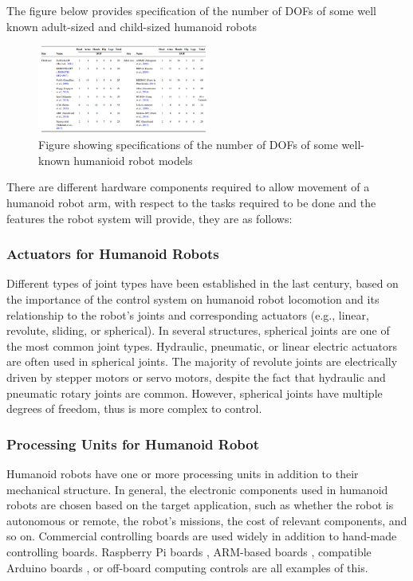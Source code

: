 \documentclass[conference]{IEEEtran}
\begin{document}
The figure below provides specification of the number of DOFs of some well known adult-sized and child-sized  humanoid robots

\begin{figure}[h]
    \centerline{\includegraphics[width=0.5\textwidth]{prerak_images/Picture7.png}}
    \caption{Figure showing specifications of the number of DOFs of some well-known humanioid robot models}
\label{prerakfig5}
\end{figure}

There are different hardware components required to allow movement of a humanoid robot arm, with respect to the tasks required to be done and the features the robot system will provide, they are as follows:

\subsubsection{Actuators for Humanoid Robots}
Different types of joint types have been established in the last century, based on the importance of the control system on humanoid robot locomotion and its relationship to the robot's joints and corresponding actuators (e.g., linear, revolute, sliding, or spherical). In several structures, spherical joints are one of the most common joint types. Hydraulic, pneumatic, or linear electric actuators are often used in spherical joints. The majority of revolute joints are electrically driven by stepper motors or servo motors, despite the fact that hydraulic and pneumatic rotary joints are common. However, spherical joints have multiple degrees of freedom, thus is more complex to control.

\subsubsection{Processing Units for Humanoid Robot}
 Humanoid robots have one or more processing units in addition to their mechanical structure. In general, the electronic components used in humanoid robots are chosen based on the target application, such as whether the robot is autonomous or remote, the robot's missions, the cost of relevant components, and so on. Commercial controlling boards are used widely in addition to hand-made controlling boards. Raspberry Pi boards\autocite{7mejias2017easy} , ARM-based boards \autocite{9almubarak2017design}, compatible Arduino boards \autocite{8al2012development}, or off-board computing controls\autocite{10khokar2015implementation} are all examples of this.
\end{document}
